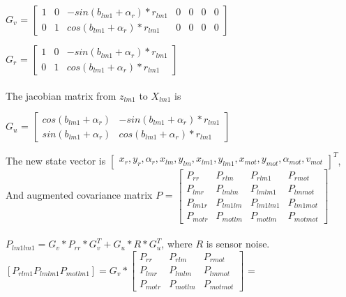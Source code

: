 \documentclass[11pt,a4paper]{article}
\begin{document}
\noindent $G_{v}$ = $  \begin{bmatrix} 1 & 0 & - sin(b_{lm1}+\alpha_{r})*r_{lm1} & 0 & 0 & 0 & 0\\
                             0 & 1 &  cos(b_{lm1}+\alpha_{r})*r_{lm1}  & 0 & 0 & 0 & 0\end{bmatrix}$


                       
\noindent $G_{r}$ = $  \begin{bmatrix} 1 & 0 & - sin(b_{lm1}+\alpha_{r})*r_{lm1}\\
                             0 & 1 &  cos(b_{lm1}+\alpha_{r})*r_{lm1} \end{bmatrix}$
\\
\\
\noindent The jacobian matrix from $z_{lm1}$ to $X_{lm1}$ is 

$G_{u}$ = $  \begin{bmatrix}  cos(b_{lm1}+\alpha_{r})    & - sin(b_{lm1}+\alpha_{r})*r_{lm1}  \\
                                 sin(b_{lm1}+\alpha_{r}) &  cos(b_{lm1}+\alpha_{r})*r_{lm1} \end{bmatrix}$

\noindent The new state vector is $\begin{bmatrix} x_{r}, y_{r}, \alpha_{r}, x_{lm}, y_{lm}, x_{lm1}, y_{lm1},  x_{mot}, y_{mot}, \alpha_{mot}, v_{mot} \end{bmatrix}^{T}$, 
\\

\noindent And augmented covariance matrix $P$ = $\begin{bmatrix} P_{rr} & P_{rlm} & P_{rlm1} & P_{rmot}\\
										   P_{lmr}& P_{lmlm} & P_{lmlm1} & P_{lmmot}\\
										   P_{lm1r}& P_{lm1lm} & P_{lm1lm1} & P_{lm1mot}\\ 
										   P_{motr}& P_{motlm} & P_{motlm} & P_{motmot}\end{bmatrix}$
\\
\\
\noindent $P_{lm1lm1} = G_{v}*P_{rr}*G_{v}^{T} + G_{u}*R*G_{u}^{T}$, where $R$ is sensor noise.
\\

\noindent $[P_{rlm1}  P_{lmlm1}  P_{motlm1}] = G_{v}*\begin{bmatrix} P_{rr} & P_{rlm} & P_{rmot}\\
										   P_{lmr}& P_{lmlm}  & P_{lmmot}\\
										   P_{motr}& P_{motlm}  & P_{motmot}\end{bmatrix}$ =
										   
\end{document}
